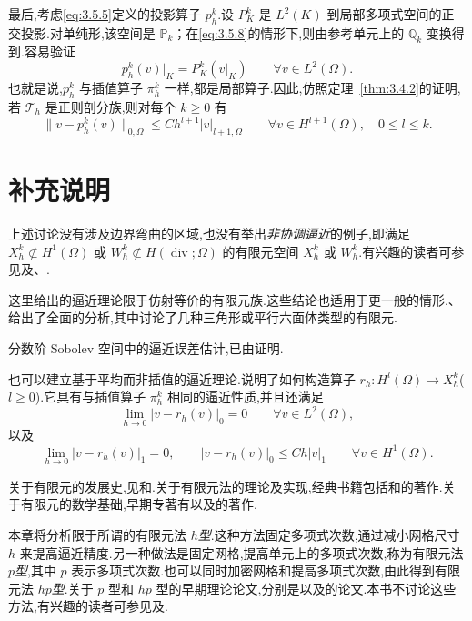 最后,考虑\eqref{eq:3.5.5}定义的投影算子 \(p_h^k\).设 \(P_K^k\) 是 \(L^2(K)\) 到局部多项式空间的正交投影.对单纯形,该空间是 \(\mathbb P_k\)；在\eqref{eq:3.5.8}的情形下,则由参考单元上的 \(\mathbb Q_k\) 变换得到.容易验证
\begin{equation}\label{eq:3.5.23}
  p_h^k(v)|_K=P_K^k(v|_K)\qquad\forall v\in L^2(\Omega).
\end{equation}
也就是说,\(p_h^k\) 与插值算子 \(\pi_h^k\) 一样,都是局部算子.因此,仿照定理~\ref{thm:3.4.2}的证明,若 \(\mathcal T_h\) 是正则剖分族,则对每个 \(k\ge0\) 有
\begin{equation}\label{eq:3.5.24}
  \|v-p_h^k(v)\|_{0,\Omega}\le Ch^{l+1}|v|_{l+1,\Omega}
  \qquad\forall v\in H^{l+1}(\Omega),\quad 0\le l\le k.
\end{equation}

\section{补充说明}\label{sec:3.6}

上述讨论没有涉及边界弯曲的区域,也没有举出\emph{非协调逼近}的例子,即满足 \(X_h^k\not\subset H^1(\Omega)\) 或 \(W_h^k\not\subset H(\operatorname{div};\Omega)\) 的有限元空间 \(X_h^k\) 或 \(W_h^k\).有兴趣的读者可参见及、.

这里给出的逼近理论限于仿射等价的有限元族.这些结论也适用于更一般的情形.、给出了全面的分析,其中讨论了几种三角形或平行六面体类型的有限元.

分数阶 Sobolev 空间中的逼近误差估计,已由证明.

也可以建立基于平均而非插值的逼近理论.说明了如何构造算子 \(r_h\colon H^l(\Omega)\to X_h^k\)(\(l\ge0\)).它具有与插值算子 \(\pi_h^k\) 相同的逼近性质,并且还满足
\[
  \lim_{h\to0}|v-r_h(v)|_0=0\qquad\forall v\in L^2(\Omega),
\]
以及
\[
  \lim_{h\to0}|v-r_h(v)|_1=0,\qquad
  |v-r_h(v)|_0\le Ch|v|_1\qquad\forall v\in H^1(\Omega).
\]

关于有限元的发展史,见和.关于有限元法的理论及实现,经典书籍包括和的著作.关于有限元的数学基础,早期专著有以及的著作.

本章将分析限于所谓的有限元法 \(h\)\emph{型}.这种方法固定多项式次数,通过减小网格尺寸 \(h\) 来提高逼近精度.另一种做法是固定网格,提高单元上的多项式次数,称为有限元法 \(p\)\emph{型},其中 \(p\) 表示多项式次数.也可以同时加密网格和提高多项式次数,由此得到有限元法 \(hp\)\emph{型}.关于 \(p\) 型和 \(hp\) 型的早期理论论文,分别是以及的论文.本书不讨论这些方法,有兴趣的读者可参见及.
